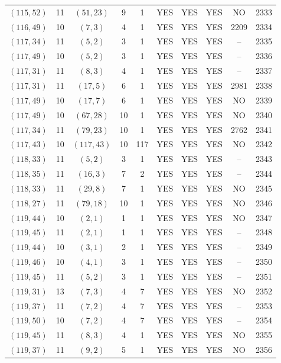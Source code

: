 \begin{longtable}{|c|c|c|c|c|c|c|c|c|c|}
$(115, 52)$ & 11 & $(51, 23)$ & 9 & 1 & YES & YES & YES & NO & 2333\\
$(116, 49)$ & 10 & $(7, 3)$ & 4 & 1 & YES & YES & YES & 2209 & 2334\\
$(117, 34)$ & 11 & $(5, 2)$ & 3 & 1 & YES & YES & YES & -- & 2335\\
$(117, 49)$ & 10 & $(5, 2)$ & 3 & 1 & YES & YES & YES & -- & 2336\\
$(117, 31)$ & 11 & $(8, 3)$ & 4 & 1 & YES & YES & YES & -- & 2337\\
$(117, 31)$ & 11 & $(17, 5)$ & 6 & 1 & YES & YES & YES & 2981 & 2338\\
$(117, 49)$ & 10 & $(17, 7)$ & 6 & 1 & YES & YES & YES & NO & 2339\\
$(117, 49)$ & 10 & $(67, 28)$ & 10 & 1 & YES & YES & YES & NO & 2340\\
$(117, 34)$ & 11 & $(79, 23)$ & 10 & 1 & YES & YES & YES & 2762 & 2341\\
$(117, 43)$ & 10 & $(117, 43)$ & 10 & 117 & YES & YES & YES & NO & 2342\\
$(118, 33)$ & 11 & $(5, 2)$ & 3 & 1 & YES & YES & YES & -- & 2343\\
$(118, 35)$ & 11 & $(16, 3)$ & 7 & 2 & YES & YES & YES & -- & 2344\\
$(118, 33)$ & 11 & $(29, 8)$ & 7 & 1 & YES & YES & YES & NO & 2345\\
$(118, 27)$ & 11 & $(79, 18)$ & 10 & 1 & YES & YES & YES & NO & 2346\\
$(119, 44)$ & 10 & $(2, 1)$ & 1 & 1 & YES & YES & YES & NO & 2347\\
$(119, 45)$ & 11 & $(2, 1)$ & 1 & 1 & YES & YES & YES & -- & 2348\\
$(119, 44)$ & 10 & $(3, 1)$ & 2 & 1 & YES & YES & YES & -- & 2349\\
$(119, 46)$ & 10 & $(4, 1)$ & 3 & 1 & YES & YES & YES & -- & 2350\\
$(119, 45)$ & 11 & $(5, 2)$ & 3 & 1 & YES & YES & YES & -- & 2351\\
$(119, 31)$ & 13 & $(7, 3)$ & 4 & 7 & YES & YES & YES & NO & 2352\\
$(119, 37)$ & 11 & $(7, 2)$ & 4 & 7 & YES & YES & YES & -- & 2353\\
$(119, 50)$ & 10 & $(7, 2)$ & 4 & 7 & YES & YES & YES & -- & 2354\\
$(119, 45)$ & 11 & $(8, 3)$ & 4 & 1 & YES & YES & YES & NO & 2355\\
$(119, 37)$ & 11 & $(9, 2)$ & 5 & 1 & YES & YES & YES & NO & 2356\\

\end{longtable}
